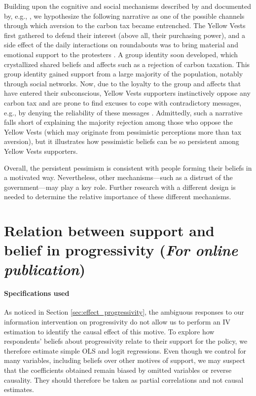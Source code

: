 \documentclass[12pt]{article} %
\begin{document}
\begin{appendices}
Building upon the cognitive and social mechanisms described by \citet{kraft_why_2015} and documented by, e.g., \citet{redlawsk_hot_2002}, we hypothesize the following narrative as one of the possible channels through which aversion to the carbon tax became entrenched. The Yellow Vests first gathered to defend their interest (above all, their purchasing power), and a side effect of the daily interactions on roundabouts was to bring material and emotional support to the protesters \citep{challier_rencontres_2019}. A group identity soon developed, which crystallized shared beliefs and affects such as a rejection of carbon taxation. This group identity gained support from a large majority of the population, notably through social networks. Now, due to the loyalty to the group and affects that have entered their subconscious, Yellow Vests supporters instinctively oppose any carbon tax and are prone to find excuses to cope with contradictory messages, e.g., by denying the reliability of these messages \citep{golman_preference_2016}. Admittedly, such a narrative falls short of explaining the majority rejection among those who oppose the Yellow Vests (which may originate from pessimistic perceptions more than tax aversion), but it illustrates how pessimistic beliefs can be so persistent among Yellow Vests supporters.

Overall, the persistent pessimism is consistent with people forming their beliefs in a motivated way. Nevertheless, other mechanisms---such as a distrust of the government---may play a key role. Further research with a different design is needed to determine the relative importance of these different mechanisms.

\section{Relation between support and belief in progressivity (\emph{For online publication})\label{sec:appendix_effect_progressivity}}

\paragraph{Specifications used}


As noticed in Section \ref{sec:effect_progressivity}, the ambiguous responses to our information intervention on progressivity do not allow us to perform an IV estimation to identify the causal effect of this motive. To explore how respondents' beliefs about progressivity relate to their support for the policy, we therefore estimate simple OLS and logit regressions. Even though we control for many variables, including beliefs over other motives of support, we may suspect that the coefficients obtained remain biased by omitted variables or reverse causality. They should therefore be taken as partial correlations and not causal estimates.


\end{appendices}
\end{document}
